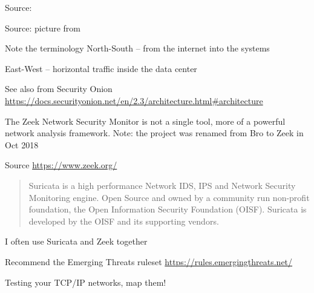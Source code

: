 \documentclass[Screen16to9,17pt]{foils}
\begin{document}
Source: \\{\footnotesize
{}
}



Source: picture from 

\begin{list2}
\item Note the terminology North-South -- from the internet into the systems
\item East-West -- horizontal traffic inside the data center
\item See also from Security Onion \url{https://docs.securityonion.net/en/2.3/architecture.html#architecture}
\end{list2}





The Zeek Network Security Monitor is not a single tool, more of a
powerful network analysis framework. Note: the project was renamed from Bro to Zeek in Oct 2018

{\small Source \url{https://www.zeek.org/}}




\begin{quote}
Suricata is a high performance Network IDS, IPS and Network Security Monitoring engine. Open Source and owned by a community run non-profit foundation, the Open Information Security Foundation (OISF). Suricata is developed by the OISF and its supporting vendors.
\end{quote}


\centerline{I often use Suricata and Zeek together}

Recommend the Emerging Threats ruleset \url{https://rules.emergingthreats.net/}




Testing your TCP/IP networks, map them!
\end{document}
